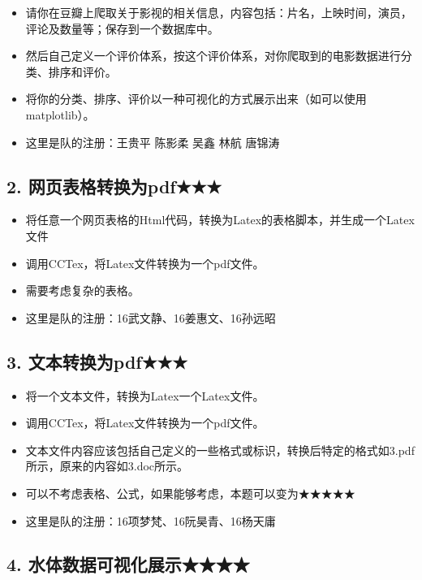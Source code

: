 \documentclass[11pt]{article}
\providecommand{\tightlist}{%
      \setlength{\itemsep}{0pt}\setlength{\parskip}{0pt}}
\begin{document}
\begin{itemize}
\tightlist
\item
  请你在豆瓣上爬取关于影视的相关信息，内容包括：片名，上映时间，演员，评论及数量等；保存到一个数据库中。
\item
  然后自己定义一个评价体系，按这个评价体系，对你爬取到的电影数据进行分类、排序和评价。
\item
  将你的分类、排序、评价以一种可视化的方式展示出来（如可以使用matplotlib）。
\item
  这里是队的注册：王贵平 陈影柔 吴鑫 林航 唐锦涛
\end{itemize}

    \subsection{2.
网页表格转换为pdf★★★}\label{ux7f51ux9875ux8868ux683cux8f6cux6362ux4e3apdf}

\begin{itemize}
\tightlist
\item
  将任意一个网页表格的Html代码，转换为Latex的表格脚本，并生成一个Latex文件
\item
  调用CCTex，将Latex文件转换为一个pdf文件。
\item
  需要考虑复杂的表格。
\item
  这里是队的注册：16武文静、16姜惠文、16孙远昭
\end{itemize}

    \subsection{3.
文本转换为pdf★★★}\label{ux6587ux672cux8f6cux6362ux4e3apdf}

\begin{itemize}
\tightlist
\item
  将一个文本文件，转换为Latex一个Latex文件。
\item
  调用CCTex，将Latex文件转换为一个pdf文件。
\item
  文本文件内容应该包括自己定义的一些格式或标识，转换后特定的格式如3.pdf所示，原来的内容如3.doc所示。
\item
  可以不考虑表格、公式，如果能够考虑，本题可以变为★★★★★
\item
  这里是队的注册：16项梦梵、16阮昊青、16杨天庸
\end{itemize}

    \subsection{4.
水体数据可视化展示★★★★}\label{ux6c34ux4f53ux6570ux636eux53efux89c6ux5316ux5c55ux793a}
\end{document}
